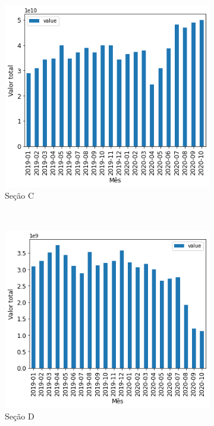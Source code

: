 \begin{figure}[htb]
\begin{subfigure}[b]{0.45\textwidth}
    \end{subfigure} ~ \\
    \begin{subfigure}[b]{0.45\textwidth}
        \includegraphics[scale=0.45]{images/base-de-dados-16.C-valor-mensal-por-secao.png}
        \caption{Seção C}
        \label{fig:pandemia:descritiva-16.C-valor-mensal-por-secao}
    \end{subfigure} ~ \quad
    \begin{subfigure}[b]{0.45\textwidth}
        \includegraphics[scale=0.45]{images/base-de-dados-16.D-valor-mensal-por-secao.png}
        \caption{Seção D}
        \label{fig:pandemia:descritiva-16.D-valor-mensal-por-secao}
    \end{subfigure} ~ \\
    \begin{subfigure}[b]{0.45\textwidth} 

\end{subfigure}
\end{figure}
